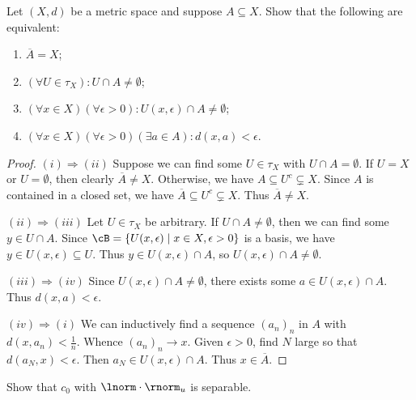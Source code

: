 \documentclass[11pt,twoside,openany]{memoir}
\begin{document}
    \begin{exercise}
        Let $(X,d)$ be a metric space and suppose $A \subseteq X$. Show that the following are equivalent:
            \begin{enumerate}[label = (\roman*),itemsep=1pt,topsep=3pt]
                \item $\overline{A} = X$;
                \item $(\forall U \in \tau_X): U \cap A \neq \emptyset$;
                \item $(\forall x \in X)(\forall \epsilon > 0): U(x,\epsilon) \cap A \neq \emptyset$;
                \item $(\forall x \in X)(\forall \epsilon > 0)(\exists a \in A):d(x,a) < \epsilon$.
            \end{enumerate}
    \end{exercise}
        \begin{proof}
            $(i) \Rightarrow (ii)$ Suppose we can find some $U \in \tau_X$ with $U \cap A = \emptyset$. If $U = X$ or $U = \emptyset$, then clearly $\overline{A} \neq X$. Otherwise, we have $A \subseteq U^c \subsetneq X$. Since $A$ is contained in a closed set, we have $\overline{A} \subseteq U^c \subsetneq X$. Thus $\overline{A} \neq X$.

            $(ii) \Rightarrow (iii)$ Let $U \in \tau_X$ be arbitrary. If $U \cap A \neq \emptyset$, then we can find some $y \in U \cap A$. Since $\cB = \{U(x,\epsilon) \mid x\in X, \epsilon > 0\}$ is a basis, we have $y \in U(x,\epsilon) \subseteq U$. Thus $y \in U(x,\epsilon) \cap A$, so $U(x,\epsilon) \cap A \neq \emptyset$. 

            $(iii) \Rightarrow (iv)$ Since $U(x,\epsilon) \cap A \neq \emptyset$, there exists some $a \in U(x,\epsilon) \cap A$. Thus $d(x,a) < \epsilon$.

            $(iv) \Rightarrow (i)$ We can inductively find a sequence $(a_n)_n$ in $A$ with $d(x,a_n) < \frac{1}{n}$. Whence $(a_n)_n \rightarrow x$. Given $\epsilon > 0$, find $N$ large so that $d(a_N,x) < \epsilon$. Then $a_N \in U(x,\epsilon) \cap A$. Thus $x \in \overline{A}$.
        \end{proof}
    \addtocounter{exercise}{1}
    \begin{exercise}
        Show that $c_0$ with $\lnorm \cdot \rnorm_u$ is separable.
    \end{exercise}
\end{document}

